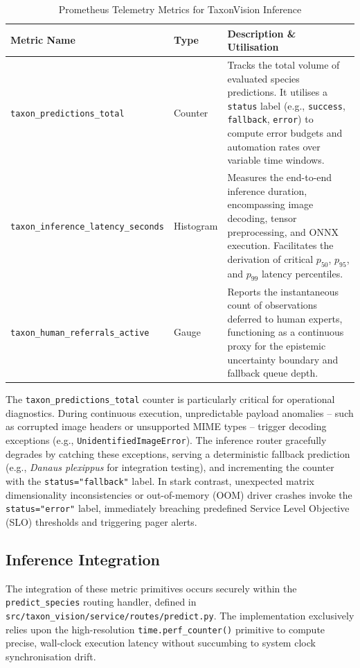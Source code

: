 \begin{table}[ht]
\centering
\caption{Prometheus Telemetry Metrics for TaxonVision Inference}
\label{tab:prometheus_metrics}
\begin{tabularx}{\textwidth}{llX}
\toprule
\textbf{Metric Name} & \textbf{Type} & \textbf{Description \& Utilisation} \\
\midrule
\texttt{taxon\_predictions\_total} & Counter & Tracks the total volume of evaluated species predictions. It utilises a \texttt{status} label (e.g., \texttt{success}, \texttt{fallback}, \texttt{error}) to compute error budgets and automation rates over variable time windows. \\
\texttt{taxon\_inference\_latency\_seconds} & Histogram & Measures the end-to-end inference duration, encompassing image decoding, tensor preprocessing, and ONNX execution. Facilitates the derivation of critical $p_{50}$, $p_{95}$, and $p_{99}$ latency percentiles. \\
\texttt{taxon\_human\_referrals\_active} & Gauge & Reports the instantaneous count of observations deferred to human experts, functioning as a continuous proxy for the epistemic uncertainty boundary and fallback queue depth. \\
\bottomrule
\end{tabularx}
\end{table}

The \texttt{taxon\_predictions\_total} counter is particularly critical for operational diagnostics. During continuous execution, unpredictable payload anomalies -- such as corrupted image headers or unsupported MIME types -- trigger decoding exceptions (e.g., \texttt{UnidentifiedImageError}). The inference router gracefully degrades by catching these exceptions, serving a deterministic fallback prediction (e.g., \textit{Danaus plexippus} for integration testing), and incrementing the counter with the \texttt{status="fallback"} label. In stark contrast, unexpected matrix dimensionality inconsistencies or out-of-memory (OOM) driver crashes invoke the \texttt{status="error"} label, immediately breaching predefined Service Level Objective (SLO) thresholds and triggering pager alerts.

\subsection{Inference Integration}

The integration of these metric primitives occurs securely within the \texttt{predict\_species} routing handler, defined in \texttt{src/taxon\_vision/service/routes/predict.py}. The implementation exclusively relies upon the high-resolution \texttt{time.perf\_counter()} primitive to compute precise, wall-clock execution latency without succumbing to system clock synchronisation drift.

